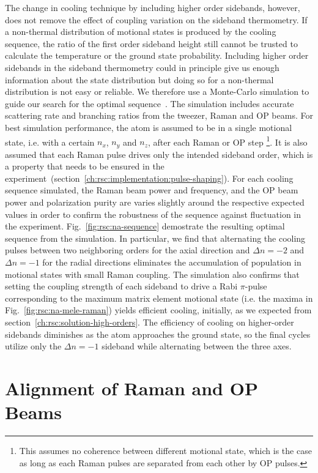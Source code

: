The change in cooling technique by including higher order sidebands, however,
does not remove the effect of coupling variation on the sideband thermometry.
If a non-thermal distribution of motional states is produced by the cooling sequence,
the ratio of the first order sideband height still cannot be trusted to calculate
the temperature or the ground state probability.
Including higher order sidebands in the sideband thermometry could in principle
give us enough information about the state distribution but doing
so for a non-thermal distribution is not easy or reliable.
We therefore use a Monte-Carlo simulation to guide our search
for the optimal sequence~\cite{dalibard_wave-function_1992,chretien_laser_2014}.
The simulation includes accurate scattering rate and branching ratios
from the tweezer, Raman and OP beams.
For best simulation performance, the atom is assumed to be in a single motional state,
i.e. with a certain $n_x$, $n_y$ and $n_z$, after each Raman or OP step
\footnote{This assumes no coherence between different motional state,
  which is the case as long as each Raman pulses are separated from each other by OP pulses.}.
It is also assumed that each Raman pulse drives only the intended sideband order,
which is a property that needs to be ensured
in the experiment~(section~\ref{ch:rsc:implementation:pulse-shaping}).
For each cooling sequence simulated,
the Raman beam power and frequency, and the OP beam power and polarization purity
are varies slightly around the respective expected values
in order to confirm the robustness of the sequence against fluctuation in the experiment.
Fig.~\ref{fig:rsc:na-sequence} demostrate the resulting optimal sequence from the simulation.
In particular, we find that alternating the cooling pulses between two
neighboring orders for the axial direction and $\Delta n=-2$ and $\Delta n=-1$
for the radial directions
eliminates the accumulation of population in motional states with small Raman coupling.
The simulation also confirms that setting the coupling strength of each sideband
to drive a Rabi $\pi$-pulse corresponding to the maximum matrix element motional state
(i.e. the maxima in Fig.~\ref{fig:rsc:na-mele-raman}) yields efficient cooling, initially,
as we expected from section~\ref{ch:rsc:solution-high-orders}.
The efficiency of cooling on higher-order sidebands diminishes
as the atom approaches the ground state, so the final cycles utilize only
the $\Delta n=-1$ sideband while alternating between the three axes.

\section{Alignment of Raman and OP Beams}
\label{ch:rsc:alignment}


